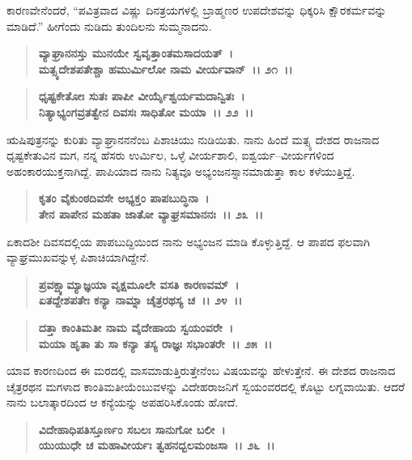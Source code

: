 ಕಾರಣವೇನೆಂದರೆ, “ಪವಿತ್ರವಾದ ವಿಷ್ಣು ದಿನತ್ರಯಗಳಲ್ಲಿ ಬ್ರಾಹ್ಮಣರ ಉಪದೇಶವನ್ನು ಧಿಕ್ಕರಿಸಿ ಕ್ಷೌರಕರ್ಮವನ್ನು ಮಾಡಿದೆ.” ಹೀಗೆಂದು ನುಡಿದು ತುಂದಿಲನು ಸುಮ್ಮನಾದನು.

\begin{verse}
\textbf{ವ್ಯಾಘ್ರಾನನಸ್ತು ಮುನಯೇ ಸ್ವವೃತ್ತಾಂತಮಸಾದಯತ್~।}\\\textbf{ಮತ್ಸ್ಯದೇಶಪತೇಶ್ಚಾ ಹಮುರ್ಮಿಲೋ ನಾಮ ವೀರ್ಯವಾನ್~।। ೨೧~।। }
\end{verse}

\begin{verse}
\textbf{ಧೃಷ್ಟಕೇತೋಃ ಸುತಃ ಪಾಪೀ ವೀರ್ಯೈಶ್ವರ್ಯಮದಾನ್ವಿತಃ~।}\\\textbf{ನಿತ್ಯಾಭ್ಯಂಗವ್ರತತ್ವೇನ ದಿವಸಃ ಸಾಧಿತೋ ಮಯಾ~।। ೨೨~।। }
\end{verse}

ಋಷಿಪುತ್ರನನ್ನು ಕುರಿತು ವ್ಯಾಘ್ರಾನನನೆಂಬ ಪಿಶಾಚಿಯು ನುಡಿಯಿತು. ನಾನು ಹಿಂದೆ ಮತ್ಸ್ಯ ದೇಶದ ರಾಜನಾದ ಧೃಷ್ಟಕೇತುವಿನ ಮಗ, ನನ್ನ ಹೆಸರು ಉರ್ಮಿಲ, ಒಳ್ಳೆ ವೀರ್ಯಶಾಲಿ, ಐಶ್ವರ್ಯ–ವೀರ್ಯಗಳಿಂದ ಅಹಂಕಾರಯುಕ್ತನಾಗಿದ್ದೆ. ಪಾಪಿಯಾದ ನಾನು ನಿತ್ಯವೂ ಅಭ್ಯಂಜನಸ್ನಾನಮಾಡುತ್ತಾ ಕಾಲ ಕಳೆಯುತ್ತಿದ್ದೆ.

\begin{verse}
\textbf{ಕೃತಂ ವೈಕುಂಠದಿವಸೇ ಅಭ್ಯಕ್ತಂ ಪಾಪಬುದ್ಧಿನಾ~।}\\\textbf{ತೇನ ಪಾಪೇನ ಮಹತಾ ಜಾತೋ ವ್ಯಾಘ್ರಸಮಾನನಃ~।। ೨೩~।। }
\end{verse}

ಏಕಾದಶೀ ದಿವಸದಲ್ಲಿಯ ಪಾಪಬುದ್ದಿಯಿಂದ ನಾನು ಅಭ್ಯಂಜನ ಮಾಡಿ ಕೊಳ್ಳುತ್ತಿದ್ದೆ. ಆ ಪಾಪದ ಫಲವಾಗಿ ವ್ಯಾಘ್ರಮುಖವನ್ನುಳ್ಳ ಪಿಶಾಚಿಯಾಗಿದ್ದೇನೆ.

\begin{verse}
\textbf{ಪ್ರವಕ್ಷ್ಯಾಮ್ಯಾಜ್ಞಯಾ ವೃಕ್ಷಮೂಲೇ ವಸತಿ ಕಾರಣವಮ್~।}\\\textbf{ಏತದ್ದೇಶಪತೇಃ ಕನ್ಯಾ ನಾಮ್ನಾ ಚೈತ್ರರಥಸ್ಯ ಚ~।। ೨೪~।।} 
\end{verse}

\begin{verse}
\textbf{ದತ್ತಾ ಕಾಂತಿಮತೀ ನಾಮ ವೈದೇಹಾಯ ಸ್ವಯಂವರೇ~।}\\\textbf{ಮಯಾ ಹೃತಾ ತು ಸಾ ಕನ್ಯಾ ತಸ್ಯ ರಾಜ್ಞಃ ಸಭಾಂತರೇ~।। ೨೫~।। }
\end{verse}

ಯಾವ ಕಾರಣದಿಂದ ಈ ಮರದಲ್ಲಿ ವಾಸಮಾಡುತ್ತಿರುತ್ತೇನೆಂಬ ವಿಷಯವನ್ನು ಹೇಳು\-ತ್ತೇನೆ. ಈ ದೇಶದ ರಾಜನಾದ ಚೈತ್ರರಥನ ಮಗಳಾದ ಕಾಂತಿಮತೀಯೆಂಬುವಳನ್ನು ವಿದೇಹರಾಜನಿಗೆ ಸ್ವಯಂವರದಲ್ಲಿ ಕೊಟ್ಟು ಲಗ್ನವಾಯಿತು. ಆದರೆ ನಾನು ಬಲಾತ್ಕಾರದಿಂದ ಆ ಕನ್ಯೆಯನ್ನು ಅಪಹರಿಸಿಕೊಂಡು ಹೋದೆ.

\begin{verse}
\textbf{ವಿದೇಹಾಧಿಪತಿಸ್ತೂರ್ಣಂ ಸಬಲಃ ಸಾನುಗೋ ಬಲೀ~।}\\\textbf{ಯುಯುಧೇ ಚ ಮಹಾವೀರ್ಯಃ ತ್ವಹನದ್ಬಲಮಂಜಸಾ~।। ೨೬~।।}
\end{verse}

